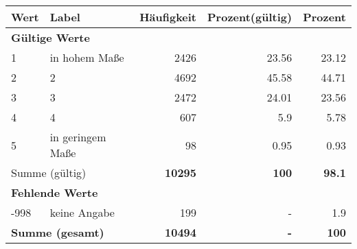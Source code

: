      \begin{longtable}{lXrrr}
     \toprule
     \textbf{Wert} & \textbf{Label} & \textbf{Häufigkeit} & \textbf{Prozent(gültig)} & \textbf{Prozent} \\
     \endhead
     \midrule
     \multicolumn{5}{l}{\textbf{Gültige Werte}}\\

     1 &
     \multicolumn{1}{X}{ in hohem Maße   } &


       \num{2426} &
       \num[round-mode=places,round-precision=2]{23,56} &
         \num[round-mode=places,round-precision=2]{23,12} \\

     2 &
     \multicolumn{1}{X}{ 2   } &


       \num{4692} &
       \num[round-mode=places,round-precision=2]{45,58} &
         \num[round-mode=places,round-precision=2]{44,71} \\

     3 &
     \multicolumn{1}{X}{ 3   } &


       \num{2472} &
       \num[round-mode=places,round-precision=2]{24,01} &
         \num[round-mode=places,round-precision=2]{23,56} \\

     4 &
     \multicolumn{1}{X}{ 4   } &


       \num{607} &
       \num[round-mode=places,round-precision=2]{5,9} &
         \num[round-mode=places,round-precision=2]{5,78} \\

     5 &
     \multicolumn{1}{X}{ in geringem Maße   } &


       \num{98} &
       \num[round-mode=places,round-precision=2]{0,95} &
         \num[round-mode=places,round-precision=2]{0,93} \\
     \midrule
     \multicolumn{2}{l}{Summe (gültig)} &
       \textbf{\num{10295}} &
     \textbf{100} &
       \textbf{\num[round-mode=places,round-precision=2]{98,1}} \\
     \multicolumn{5}{l}{\textbf{Fehlende Werte}}\\
       -998 &
       keine Angabe &
         \num{199} &
        - &
         \num[round-mode=places,round-precision=2]{1,9} \\
     \midrule
     \multicolumn{2}{l}{\textbf{Summe (gesamt)}} &
          \textbf{\num{10494}} &
        \textbf{-} &
        \textbf{100} \\
     \bottomrule
     \end{longtable}
     
